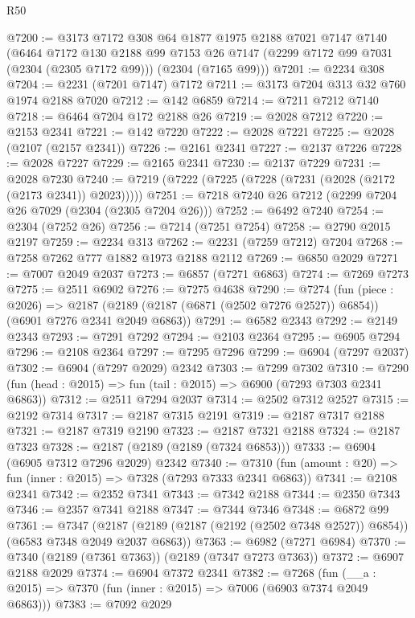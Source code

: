 \begin{lexlean}{R50}
\begin{coremodule}
@7200 := @3173
    @7172
    @308
    @64
    @1877
    @1975
    @2188
    @7021
    @7147
    @7140
    (@6464
      @7172
      @130
      @2188
      @99
      @7153
      @26
      @7147
      (@2299 @7172 @99 @7031 (@2304 (@2305 @7172 @99)))
      (@2304 (@7165 @99)))
@7201 := @2234 @308
@7204 := @2231 (@7201 @7147) @7172
@7211 := @3173 @7204 @313 @32 @760 @1974 @2188 @7020
@7212 := @142 @6859
@7214 := @7211 @7212 @7140
@7218 := @6464 @7204 @172 @2188 @26
@7219 := @2028 @7212
@7220 := @2153 @2341
@7221 := @142 @7220
@7222 := @2028 @7221
@7225 := @2028 (@2107 (@2157 @2341))
@7226 := @2161 @2341
@7227 := @2137 @7226
@7228 := @2028 @7227
@7229 := @2165 @2341
@7230 := @2137 @7229
@7231 := @2028 @7230
@7240 := @7219 (@7222 (@7225 (@7228 (@7231 (@2028 (@2172 (@2173 @2341)) @2023)))))
@7251 := @7218 @7240 @26 @7212 (@2299 @7204 @26 @7029 (@2304 (@2305 @7204 @26)))
@7252 := @6492 @7240
@7254 := @2304 (@7252 @26)
@7256 := @7214 (@7251 @7254)
@7258 := @2790 @2015 @2197
@7259 := @2234 @313
@7262 := @2231 (@7259 @7212) @7204
@7268 := @7258 @7262 @777 @1882 @1973 @2188 @2112
@7269 := @6850 @2029
@7271 := @7007 @2049 @2037
@7273 := @6857 (@7271 @6863)
@7274 := @7269 @7273
@7275 := @2511 @6902
@7276 := @7275 @4638
@7290 := @7274
    (fun (piece : @2026) =>
    @2187 (@2189 (@2187 (@6871 (@2502 @7276 @2527)) @6854)) (@6901 @7276 @2341 @2049 @6863))
@7291 := @6582 @2343
@7292 := @2149 @2343
@7293 := @7291 @7292
@7294 := @2103 @2364
@7295 := @6905 @7294
@7296 := @2108 @2364
@7297 := @7295 @7296
@7299 := @6904 (@7297 @2037)
@7302 := @6904 (@7297 @2029) @2342
@7303 := @7299 @7302
@7310 := @7290 (fun (head : @2015) => fun (tail : @2015) => @6900 (@7293 @7303 @2341 @6863))
@7312 := @2511 @7294 @2037
@7314 := @2502 @7312 @2527
@7315 := @2192 @7314
@7317 := @2187 @7315 @2191
@7319 := @2187 @7317 @2188
@7321 := @2187 @7319 @2190
@7323 := @2187 @7321 @2188
@7324 := @2187 @7323
@7328 := @2187 (@2189 (@2189 (@7324 @6853)))
@7333 := @6904 (@6905 @7312 @7296 @2029) @2342
@7340 := @7310 (fun (amount : @20) => fun (inner : @2015) => @7328 (@7293 @7333 @2341 @6863))
@7341 := @2108 @2341
@7342 := @2352 @7341
@7343 := @7342 @2188
@7344 := @2350 @7343
@7346 := @2357 @7341 @2188
@7347 := @7344 @7346
@7348 := @6872 @99
@7361 := @7347
    (@2187 (@2189 (@2187 (@2192 (@2502 @7348 @2527)) @6854)) (@6583 @7348 @2049 @2037 @6863))
@7363 := @6982 (@7271 @6984)
@7370 := @7340 (@2189 (@7361 @7363)) (@2189 (@7347 @7273 @7363))
@7372 := @6907 @2188 @2029
@7374 := @6904 @7372 @2341
@7382 := @7268 (fun (__a : @2015) => @7370 (fun (inner : @2015) => @7006 (@6903 @7374 @2049 @6863)))
@7383 := @7092 @2029

\end{coremodule}
\end{lexlean}
